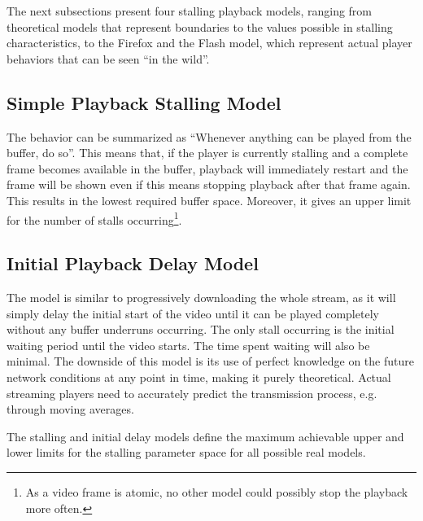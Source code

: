 
The next subsections present four stalling playback models, ranging from theoretical models that represent boundaries to the values possible in stalling characteristics, to the Firefox and the Flash model, which represent actual player behaviors that can be seen ``in the wild''.


\subsection{Simple Playback Stalling Model}
The behavior can be summarized as ``Whenever anything can be played from the buffer, do so''. This means that, if the player is currently stalling and a complete frame becomes available in the buffer, playback will immediately restart and the frame will be shown even if this means stopping playback after that frame again. This results in the lowest required buffer space. Moreover, it gives an upper limit for the number of stalls occurring\footnote{As a video frame is atomic, no other model could possibly stop the playback more often.}.

\subsection{Initial Playback Delay Model}
The model is similar to progressively downloading the whole stream, as it will simply delay the initial start of the video until it can be played completely without any buffer underruns occurring. The only stall occurring is the initial waiting period until the video starts. The time spent waiting will also be minimal. The downside of this model is its use of perfect knowledge on the future network conditions at any point in time, making it purely theoretical. Actual streaming players need to accurately predict the transmission process, e.g. through moving averages.


The stalling and initial delay models define the maximum achievable upper and lower limits for the stalling parameter space for all possible real models.


